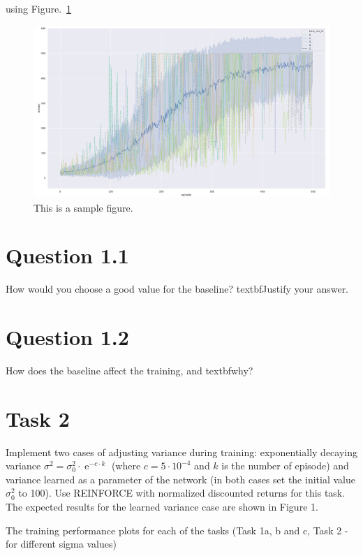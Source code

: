 \documentclass[12pt]{article}
\begin{document}
using Figure.~\ref*{fig:fig1}


\begin{figure}[h] 
	\centering  %
    \includegraphics[width=0.9\columnwidth]{img/training.pdf}
	\caption{This is a sample figure.}
	\label{fig:fig1}
\end{figure}



\section*{Question 1.1}

How would you choose a good value for the baseline? textbf{Justify your
answer.}

\section*{Question 1.2}

How does the baseline affect the training, and textbf{why?}


\section{Task 2}

Implement two cases of adjusting variance during training: exponentially
decaying variance $\sigma^2 = \sigma_0^2 \cdot \operatorname{e}^{-c \cdot k}$
(where $c = 5 \cdot 10^{−4}$ and $k$ is the number of episode) and variance
learned as a parameter of the network (in both cases set the initial value $\sigma_0^2$ 
to 100). Use REINFORCE with normalized discounted returns for this task. The expected results for the learned variance case are shown in Figure 1.
\newline

The training performance plots for each of the tasks (Task 1a, b and c, 
Task 2 - for different sigma values)
\end{document}
